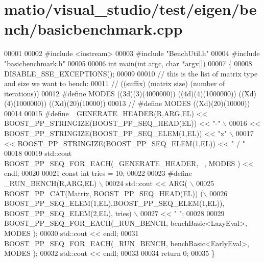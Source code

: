 \hypertarget{matio_2visual__studio_2test_2eigen_2bench_2basicbenchmark_8cpp_source}{}\section{matio/visual\+\_\+studio/test/eigen/bench/basicbenchmark.cpp}
\label{matio_2visual__studio_2test_2eigen_2bench_2basicbenchmark_8cpp_source}

\begin{DoxyCode}
00001 
00002 \textcolor{preprocessor}{#include <iostream>}
00003 \textcolor{preprocessor}{#include "BenchUtil.h"}
00004 \textcolor{preprocessor}{#include "basicbenchmark.h"}
00005 
00006 \textcolor{keywordtype}{int} main(\textcolor{keywordtype}{int} argc, \textcolor{keywordtype}{char} *argv[])
00007 \{
00008   DISABLE\_SSE\_EXCEPTIONS();
00009 
00010   \textcolor{comment}{// this is the list of matrix type and size we want to bench:}
00011   \textcolor{comment}{// ((suffix) (matrix size) (number of iterations))}
00012 \textcolor{preprocessor}{  #define MODES ((3d)(3)(4000000)) ((4d)(4)(1000000)) ((Xd)(4)(1000000)) ((Xd)(20)(10000))}
00013 \textcolor{comment}{//   #define MODES ((Xd)(20)(10000))}
00014 
00015 \textcolor{preprocessor}{  #define \_GENERATE\_HEADER(R,ARG,EL) << BOOST\_PP\_STRINGIZE(BOOST\_PP\_SEQ\_HEAD(EL)) << "-" \(\backslash\)}
00016 \textcolor{preprocessor}{    << BOOST\_PP\_STRINGIZE(BOOST\_PP\_SEQ\_ELEM(1,EL)) << "x" \(\backslash\)}
00017 \textcolor{preprocessor}{    << BOOST\_PP\_STRINGIZE(BOOST\_PP\_SEQ\_ELEM(1,EL)) << "   /   "}
00018 
00019   std::cout BOOST\_PP\_SEQ\_FOR\_EACH(\_GENERATE\_HEADER, ~, MODES ) << endl;
00020 
00021   \textcolor{keyword}{const} \textcolor{keywordtype}{int} tries = 10;
00022 
00023 \textcolor{preprocessor}{  #define \_RUN\_BENCH(R,ARG,EL) \(\backslash\)}
00024 \textcolor{preprocessor}{    std::cout << ARG( \(\backslash\)}
00025 \textcolor{preprocessor}{      BOOST\_PP\_CAT(Matrix, BOOST\_PP\_SEQ\_HEAD(EL)) (\(\backslash\)}
00026 \textcolor{preprocessor}{         BOOST\_PP\_SEQ\_ELEM(1,EL),BOOST\_PP\_SEQ\_ELEM(1,EL)), BOOST\_PP\_SEQ\_ELEM(2,EL), tries) \(\backslash\)}
00027 \textcolor{preprocessor}{    << "   ";}
00028 
00029   BOOST\_PP\_SEQ\_FOR\_EACH(\_RUN\_BENCH, benchBasic<LazyEval>, MODES );
00030   std::cout << endl;
00031   BOOST\_PP\_SEQ\_FOR\_EACH(\_RUN\_BENCH, benchBasic<EarlyEval>, MODES );
00032   std::cout << endl;
00033 
00034   \textcolor{keywordflow}{return} 0;
00035 \}
\end{DoxyCode}
